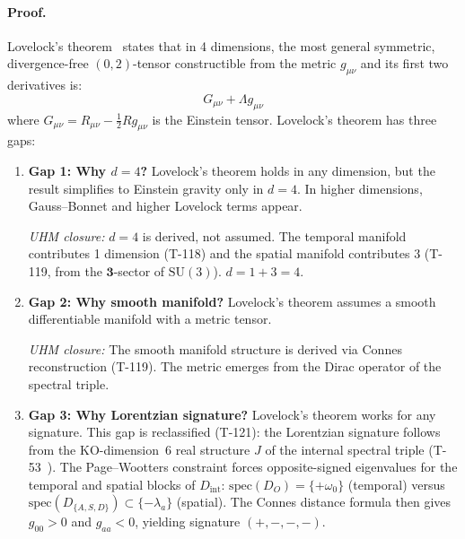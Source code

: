 \paragraph{Proof.}
Lovelock's theorem~\cite{lovelock1971} states that in 4 dimensions, the most general
symmetric, divergence-free $(0,2)$-tensor constructible from the metric $g_{\mu\nu}$ and
its first two derivatives is:
\begin{equation}
  G_{\mu\nu} + \Lambda g_{\mu\nu}
  \label{eq:lovelock}
\end{equation}
where $G_{\mu\nu} = R_{\mu\nu} - \frac{1}{2}Rg_{\mu\nu}$ is the Einstein tensor.
Lovelock's theorem has three gaps:

\begin{enumerate}[leftmargin=2em]
  \item \textbf{Gap 1: Why $d = 4$?} Lovelock's theorem holds in any dimension, but the
        result simplifies to Einstein gravity only in $d = 4$. In higher dimensions,
        Gauss--Bonnet and higher Lovelock terms appear.

        \emph{UHM closure:} $d = 4$ is derived, not assumed. The temporal manifold
        contributes 1 dimension (T-118) and the spatial manifold contributes 3 (T-119,
        from the $\mathbf{3}$-sector of $\mathrm{SU}(3)$). $d = 1 + 3 = 4$.

  \item \textbf{Gap 2: Why smooth manifold?} Lovelock's theorem assumes a smooth
        differentiable manifold with a metric tensor.

        \emph{UHM closure:} The smooth manifold structure is derived via Connes
        reconstruction (T-119). The metric emerges from the Dirac operator of the
        spectral triple.

  \item \textbf{Gap 3: Why Lorentzian signature?} Lovelock's theorem works for any
        signature. This gap is reclassified (T-121): the Lorentzian signature follows
        from the KO-dimension~6 real structure $J$ of the internal spectral triple
        (T-53~). The Page--Wootters constraint forces opposite-signed eigenvalues
        for the temporal and spatial blocks of $D_{\mathrm{int}}$:
        $\mathrm{spec}(D_O) = \{+\omega_0\}$ (temporal) versus
        $\mathrm{spec}(D_{\{A,S,D\}}) \subset \{-\lambda_a\}$ (spatial). The Connes
        distance formula then gives $g_{00} > 0$ and $g_{aa} < 0$, yielding
        signature $(+,-,-,-)$.
\end{enumerate}

